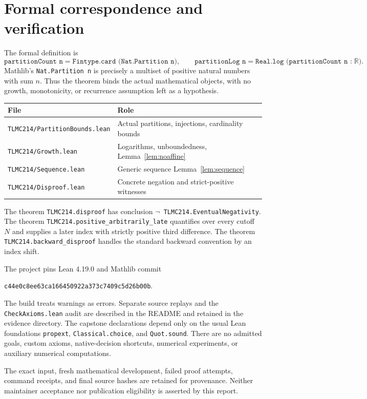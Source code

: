 \documentclass[11pt]{article}
\newcommand{\R}{\mathbb R}
\begin{document}
\section{Formal correspondence and verification}
The formal definition is
\[
\texttt{partitionCount n}=\texttt{Fintype.card (Nat.Partition n)},\qquad
\texttt{partitionLog n}=\texttt{Real.log (partitionCount n :}\;\R\texttt{)}.
\]
Mathlib's \texttt{Nat.Partition n} is precisely a multiset of positive natural numbers with sum $n$. Thus the theorem binds the actual mathematical objects, with no growth, monotonicity, or recurrence assumption left as a hypothesis.

\begin{center}
\begin{tabular}{ll}
\textbf{File} & \textbf{Role}\\\hline
\texttt{TLMC214/PartitionBounds.lean} & Actual partitions, injections, cardinality bounds\\
\texttt{TLMC214/Growth.lean} & Logarithms, unboundedness, Lemma~\ref{lem:noaffine}\\
\texttt{TLMC214/Sequence.lean} & Generic sequence Lemma~\ref{lem:sequence}\\
\texttt{TLMC214/Disproof.lean} & Concrete negation and strict-positive witnesses
\end{tabular}
\end{center}
The theorem \texttt{TLMC214.disproof} has conclusion
\texttt{\(\neg\) TLMC214.EventualNegativity}.
The theorem \texttt{TLMC214.positive\_arbitrarily\_late} quantifies over every cutoff $N$ and supplies a later index with strictly positive third difference. The theorem \texttt{TLMC214.backward\_disproof} handles the standard backward convention by an index shift.

The project pins Lean 4.19.0 and Mathlib commit
\begin{center}\small\texttt{c44e0c8ee63ca166450922a373c7409c5d26b00b}.\end{center}
The build treats warnings as errors. Separate source replays and the \texttt{CheckAxioms.lean} audit are described in the README and retained in the evidence directory. The capstone declarations depend only on the usual Lean foundations \texttt{propext}, \texttt{Classical.choice}, and \texttt{Quot.sound}. There are no admitted goals, custom axioms, native-decision shortcuts, numerical experiments, or auxiliary numerical computations.

The exact input, fresh mathematical development, failed proof attempts, command receipts, and final source hashes are retained for provenance. Neither maintainer acceptance nor publication eligibility is asserted by this report.
\end{document}
